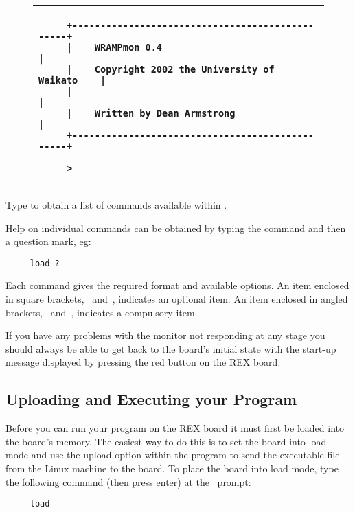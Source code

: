 \begin{figure}[hbp]
\begin{center}
\begin{tabular}{|p{15cm}|}
\hline
\begin{verbatim}
     +------------------------------------------------+
     |    WRAMPmon 0.4                                |
     |    Copyright 2002 the University of Waikato    |
     |                                                |
     |    Written by Dean Armstrong                   |
     +------------------------------------------------+

     >
\end{verbatim}
\\
\hline
\end{tabular}
\end{center}

\caption{\WRAMPmon}
\label{wrampmon}
\end{figure}

Type  to obtain a list of commands available within \WRAMPmon.

Help on individual commands can be obtained by typing the command and then a 
question mark, eg:
\begin{verbatim}
     load ?
\end{verbatim}

Each command gives the required format and available options.
An item enclosed in square brackets, \src{[}~and~\src{]},
indicates an optional item. An item enclosed in angled brackets, 
\src{<}~and~\src{>}, indicates a compulsory item.

If you have any problems with the monitor not responding at any stage you 
should always be able to get back to
the board's initial state with the start-up message displayed by pressing the 
red  button on the REX board.

\subsection{Uploading and Executing your Program}
Before you can run your program on the REX board it must first be loaded into 
the board's memory. The easiest
way to do this is to set the board into load mode and use the upload option 
within the  program to send
the executable file from the Linux machine to the board. To place the board 
into load mode, type the following
command (then press enter) at the \WRAMPmon\ prompt:
\begin{verbatim}
     load
\end{verbatim}

